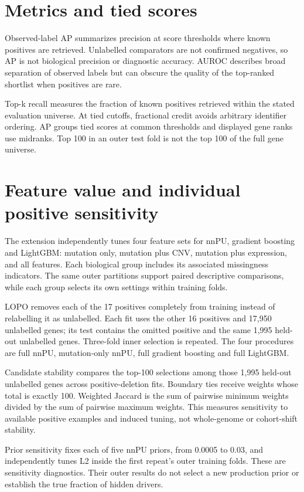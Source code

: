 \documentclass[12pt,a4paper,oneside]{report}
\begin{document}
\section{Metrics and tied scores}
Observed-label AP summarizes precision at score thresholds where known positives are retrieved. Unlabelled comparators are not confirmed negatives, so AP is not biological precision or diagnostic accuracy. AUROC describes broad separation of observed labels but can obscure the quality of the top-ranked shortlist when positives are rare.

Top-k recall measures the fraction of known positives retrieved within the stated evaluation universe. At tied cutoffs, fractional credit avoids arbitrary identifier ordering. AP groups tied scores at common thresholds and displayed gene ranks use midranks. Top 100 in an outer test fold is not the top 100 of the full gene universe.

\section{Feature value and individual positive sensitivity}
The extension independently tunes four feature sets for nnPU, gradient boosting and LightGBM: mutation only, mutation plus CNV, mutation plus expression, and all features. Each biological group includes its associated missingness indicators. The same outer partitions support paired descriptive comparisons, while each group selects its own settings within training folds.

LOPO removes each of the 17 positives completely from training instead of relabelling it as unlabelled. Each fit uses the other 16 positives and 17,950 unlabelled genes; its test contains the omitted positive and the same 1,995 held-out unlabelled genes. Three-fold inner selection is repeated. The four procedures are full nnPU, mutation-only nnPU, full gradient boosting and full LightGBM.

Candidate stability compares the top-100 selections among those 1,995 held-out unlabelled genes across positive-deletion fits. Boundary ties receive weights whose total is exactly 100. Weighted Jaccard is the sum of pairwise minimum weights divided by the sum of pairwise maximum weights. This measures sensitivity to available positive examples and induced tuning, not whole-genome or cohort-shift stability.

Prior sensitivity fixes each of five nnPU priors, from 0.0005 to 0.03, and independently tunes L2 inside the first repeat's outer training folds. These are sensitivity diagnostics. Their outer results do not select a new production prior or establish the true fraction of hidden drivers.
\end{document}
